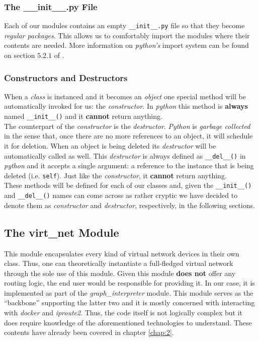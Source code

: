             \subsubsection{The \_\_init\_\_.py File}
                Each of our modules contains an empty \texttt{\_\_init\_\_.py} file so that they become \textit{regular packages}. This allows us to comfortably import the modules where their contents are needed. More information on \textit{python's} import system can be found on section $5.2.1$ of \cite{bib:python-import}.

            \subsubsection{Constructors and Destructors}
                When a \textit{class} is instanced and it becomes an \textit{object} one special method will be automatically invoked for us: the \textit{constructor}. In \textit{python} this method is \textbf{always} named \texttt{\_\_init\_\_()} and it \textbf{cannot} return anything.\\

                The counterpart of the \textit{constructor} is the \textit{destructor}. \textit{Python} is \textit{garbage collected} in the sense that, once there are no more references to an object, it will schedule it for deletion. When an object is being deleted its \textit{destructor} will be automatically called as well. This \textit{destructor} is always defined as \texttt{\_\_del\_\_()} in \textit{python} and it accepts a single argument: a reference to the instance that is being deleted (i.e. \texttt{self}). Just like the \textit{constructor}, it \textbf{cannot} return anything.\\

                These methods will be defined for each of our classes and, given the \texttt{\_\_init\_\_()} and \texttt{\_\_del\_\_()} names can come across as rather cryptic we have decided to denote them as \textit{constructor} and \textit{destructor}, respectively, in the following sections.\\

        \subsection{The virt\_net Module}
            This module encapsulates every kind of virtual network devices in their own class. Thus, one can theoretically instantiate a full-fledged virtual network through the sole use of this module. Given this module \textbf{does not} offer any routing logic, the end user would be responsible for providing it. In our case, it is implemented as part of the \textit{graph\_interpreter} module. This module serves as the ``backbone'' supporting the latter two and it is mostly concerned with interacting with \textit{docker} and \textit{iproute2}. Thus, the code itself is not logically complex but it does require knowledge of the aforementioned technologies to understand. These contents have already been covered in chapter \ref{chap:2}.\\

